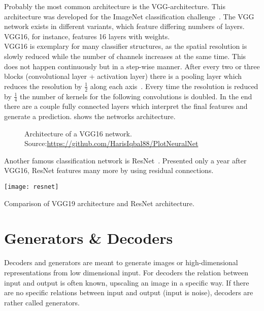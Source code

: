 Probably the most common architecture is the VGG-architecture.
This architecture was developed for the ImageNet classification challenge~\cite{imagenet}.
The VGG network exists in different variants, which feature differing numbers of layers.
VGG16, for instance, features 16 layers with weights.\\
VGG16 is exemplary for many classifier structures, as the spatial resolution is slowly reduced while the number of channels increases at the same time.
This does not happen continuously but in a step-wise manner.
After every two or three blocks (convolutional layer + activation layer) there is a pooling layer which reduces the resolution by $\frac{1}{2}$ along each axis~\cite{VGG}.
Every time the resolution is reduced by $\frac{1}{4}$ the number of kernels for the following convolutions is doubled.
In the end there are a couple fully connected layers which interpret the final features and generate a prediction.
 shows the networks architecture.
\begin{figure}
    \resizebox{1.5\textwidth}{!}{
        
    }
    \caption{Architecture of a VGG16 network. Source:\url{https://github.com/HarisIqbal88/PlotNeuralNet}}
\end{figure}


Another famous classification network is ResNet~\cite{resnet}.
Presented only a year after VGG16, ResNet features many more by using residual connections.

\begin{marginfigure}
    \texttt{[image: resnet]}
    \caption{Comparison of VGG19 architecture and ResNet architecture.}
\end{marginfigure}

\section{Generators \& Decoders}
Decoders and generators are meant to generate images or high-dimensional representations from low dimensional input.
For decoders the relation between input and output is often known, upscaling an image in a specific way.
If there are no specific relations between input and output (input is noise), decoders are rather called generators.

